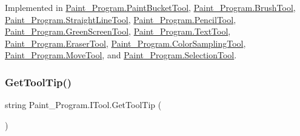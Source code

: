 Implemented in \mbox{\hyperlink{class_paint___program_1_1_paint_bucket_tool_a3167ad9df7812f1f857e0a869a455ff6}{Paint\+\_\+\+Program.\+Paint\+Bucket\+Tool}}, \mbox{\hyperlink{class_paint___program_1_1_brush_tool_ae96d4b9560f8d271694abd1e727dd14c}{Paint\+\_\+\+Program.\+Brush\+Tool}}, \mbox{\hyperlink{class_paint___program_1_1_straight_line_tool_adb914fa4551bfee82d074838032d030b}{Paint\+\_\+\+Program.\+Straight\+Line\+Tool}}, \mbox{\hyperlink{class_paint___program_1_1_pencil_tool_acef50de4028855c4a6be1ff9f63f9b3b}{Paint\+\_\+\+Program.\+Pencil\+Tool}}, \mbox{\hyperlink{class_paint___program_1_1_green_screen_tool_a02fd2ecf253f8eeb746d1e78eedb08a2}{Paint\+\_\+\+Program.\+Green\+Screen\+Tool}}, \mbox{\hyperlink{class_paint___program_1_1_text_tool_acb2114b449f982664f1fd49e3bb0b017}{Paint\+\_\+\+Program.\+Text\+Tool}}, \mbox{\hyperlink{class_paint___program_1_1_eraser_tool_a2ba0d80771829d2410b5d9a26a6896b2}{Paint\+\_\+\+Program.\+Eraser\+Tool}}, \mbox{\hyperlink{class_paint___program_1_1_color_sampling_tool_aa0e2ac4d50f9a46c0d83a226e9e701c8}{Paint\+\_\+\+Program.\+Color\+Sampling\+Tool}}, \mbox{\hyperlink{class_paint___program_1_1_move_tool_a1d458ccea18d91c95d7da179fc3503e2}{Paint\+\_\+\+Program.\+Move\+Tool}}, and \mbox{\hyperlink{class_paint___program_1_1_selection_tool_ad8d0b5e9cf0486f7e3815db1536de03d}{Paint\+\_\+\+Program.\+Selection\+Tool}}.

\mbox{\label{interface_paint___program_1_1_i_tool_ac11f1591587144b6e74f5767bbf1df56}} 
\subsubsection{\texorpdfstring{Get\+Tool\+Tip()}{GetToolTip()}}
{\footnotesize\ttfamily string Paint\+\_\+\+Program.\+I\+Tool.\+Get\+Tool\+Tip (\begin{DoxyParamCaption}{ }\end{DoxyParamCaption})}



